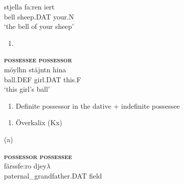 \ea\label{}
\gll stjella  fa:ren  iert\\


bell  sheep.DAT  your.N\\ %


‘the bell of your sheep’
\z


\begin{enumerate} %
\item 
\end{enumerate} %
\ea\label{}
\gll \textbf{\textsc{possessee}}  \textbf{\textsc{possessor}}\\


\ea\label{}
\gll möylhn  stäjntn  hina\\


ball.DEF  girl.DAT  this.F\\ %


‘this girl’s ball’
\z


\begin{enumerate} %
\item 
Definite possessor in the dative + indefinite possessee

\end{enumerate} %
\begin{enumerate} %
\item 
Överkalix (Kx)

\end{enumerate} %
(a)


\ea\label{}
\gll \textbf{\textsc{possessor}}  \textbf{\textsc{possessee}}\\


\ea\label{}
\gll färssfe:ro  djey$\lambda $\\


paternal\_grandfather.DAT  field\\ %


